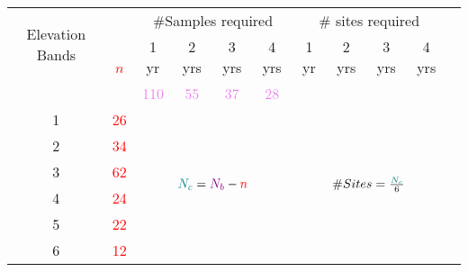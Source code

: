 \begin{table}\scriptsize
\centering
\begin{tabular}{cccccc|ccccc}
\toprule
 \multirow{2}{1cm}{Elevation Bands}  &   &  \multicolumn{4}{c|}{ \#Samples required} & \multicolumn{4}{c}{\# sites required} \\ \cline{3-10}\noalign{\smallskip}
\multicolumn{1}{c}{}&\multirow{2}{.3cm}{\textcolor{red}{$n$}}  & 1 yr  & 2 yrs   & 3 yrs    & 4 yrs                   & 1 yr   & 2 yrs  & 3 yrs  & 4 yrs\\ 
						&		           &\textcolor{violet}{110} &\textcolor{violet}{55} &\textcolor{violet}{37} &\textcolor{violet}{28}&&&&&\\ \midrule			
1   &\textcolor{red}{26}&\multicolumn{4}{c|}{\multirow{6}{*}{\large$\textcolor{teal}{N_c}={\textcolor{violet}{N_b} - \textcolor{red}{n}}$}}& \multicolumn{4}{c}{\multirow{6}{*}{\large$\#Sites = {\textcolor{teal}{N_c} \over 6}$}}                                                               \\ 
2    &\textcolor{red}{34} &\multicolumn{4}{c|}{}&\multicolumn{4}{c}{}                                                              \\ 
3    &\textcolor{red}{62}&\multicolumn{4}{c|}{}   &\multicolumn{4}{c}{}                                                                 \\
4    &\textcolor{red}{24} &\multicolumn{4}{c|}{}   &\multicolumn{4}{c}{}                                                             \\ 
5    &\textcolor{red}{22} &\multicolumn{4}{c|}{}    &\multicolumn{4}{c}{}                                                                \\ 
6    &\textcolor{red}{12} &\multicolumn{4}{c|}{}   &\multicolumn{4}{c}{}                                                       \\ \bottomrule
\end{tabular}
\end{table}

 

